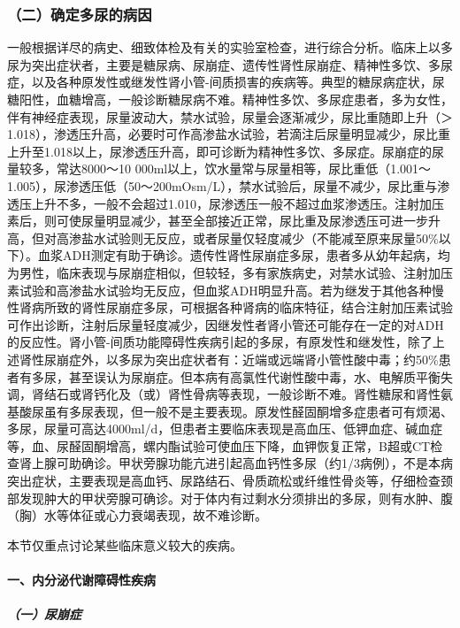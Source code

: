 \subsubsection{（二）确定多尿的病因}

一般根据详尽的病史、细致体检及有关的实验室检查，进行综合分析。临床上以多尿为突出症状者，主要是糖尿病、尿崩症、遗传性肾性尿崩症、精神性多饮、多尿症，以及各种原发性或继发性肾小管-间质损害的疾病等。典型的糖尿病症状，尿糖阳性，血糖增高，一般诊断糖尿病不难。精神性多饮、多尿症患者，多为女性，伴有神经症表现，尿量波动大，禁水试验，尿量会逐渐减少，尿比重随即上升（＞1.018），渗透压升高，必要时可作高渗盐水试验，若滴注后尿量明显减少，尿比重上升至1.018以上，尿渗透压升高，即可诊断为精神性多饮、多尿症。尿崩症的尿量较多，常达8000～10
000ml以上，饮水量常与尿量相等，尿比重低（1.001～1.005），尿渗透压低（50～200mOsm/L），禁水试验后，尿量不减少，尿比重与渗透压上升不多，一般不会超过1.010，尿渗透压一般不超过血浆渗透压。注射加压素后，则可使尿量明显减少，甚至全部接近正常，尿比重及尿渗透压可进一步升高，但对高渗盐水试验则无反应，或者尿量仅轻度减少（不能减至原来尿量50\%以下）。血浆ADH测定有助于确诊。遗传性肾性尿崩症多尿，患者多从幼年起病，均为男性，临床表现与尿崩症相似，但较轻，多有家族病史，对禁水试验、注射加压素试验和高渗盐水试验均无反应，但血浆ADH明显升高。若为继发于其他各种慢性肾病所致的肾性尿崩症多尿，可根据各种肾病的临床特征，结合注射加压素试验可作出诊断，注射后尿量轻度减少，因继发性者肾小管还可能存在一定的对ADH的反应性。肾小管-间质功能障碍性疾病引起的多尿，有原发性和继发性，除了上述肾性尿崩症外，以多尿为突出症状者有：近端或远端肾小管性酸中毒；约50\%患者有多尿，甚至误认为尿崩症。但本病有高氯性代谢性酸中毒，水、电解质平衡失调，肾结石或肾钙化及（或）肾性骨病等表现，一般诊断不难。肾性糖尿和肾性氨基酸尿虽有多尿表现，但一般不是主要表现。原发性醛固酮增多症患者可有烦渴、多尿，尿量可高达4000ml/d，但患者主要临床表现是高血压、低钾血症、碱血症等，血、尿醛固酮增高，螺内酯试验可使血压下降，血钾恢复正常，B超或CT检查肾上腺可助确诊。甲状旁腺功能亢进引起高血钙性多尿（约1/3病例），不是本病突出症状，主要表现是高血钙、尿路结石、骨质疏松或纤维性骨炎等，仔细检查颈部发现肿大的甲状旁腺可确诊。对于体内有过剩水分须排出的多尿，则有水肿、腹（胸）水等体征或心力衰竭表现，故不难诊断。

本节仅重点讨论某些临床意义较大的疾病。

\paragraph{一、内分泌代谢障碍性疾病}

\subparagraph{（一）尿崩症}

